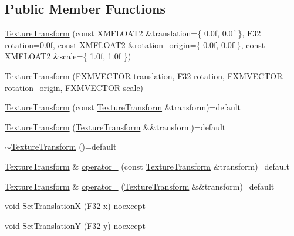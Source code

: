 \subsection*{Public Member Functions}
\begin{DoxyCompactItemize}
\item 
\hyperlink{classmage_1_1_texture_transform_a9c0f8f7f31f283b0877037489ddb2d0b}{Texture\+Transform} (const X\+M\+F\+L\+O\+A\+T2 \&translation=\{ 0.\+0f, 0.\+0f \}, F32 rotation=0.\+0f, const X\+M\+F\+L\+O\+A\+T2 \&rotation\+\_\+origin=\{ 0.\+0f, 0.\+0f \}, const X\+M\+F\+L\+O\+A\+T2 \&scale=\{ 1.\+0f, 1.\+0f \})
\item 
\hyperlink{classmage_1_1_texture_transform_ac64ee6cc9b0339dadf69e808a98387e2}{Texture\+Transform} (F\+X\+M\+V\+E\+C\+T\+OR translation, \hyperlink{namespacemage_aa97e833b45f06d60a0a9c4fc22ae02c0}{F32} rotation, F\+X\+M\+V\+E\+C\+T\+OR rotation\+\_\+origin, F\+X\+M\+V\+E\+C\+T\+OR scale)
\item 
\hyperlink{classmage_1_1_texture_transform_ae9805a51cc43bd89a4bf94ac0ac49ae2}{Texture\+Transform} (const \hyperlink{classmage_1_1_texture_transform}{Texture\+Transform} \&transform)=default
\item 
\hyperlink{classmage_1_1_texture_transform_aa0b4bd0dedfdf0351cb01d056533c984}{Texture\+Transform} (\hyperlink{classmage_1_1_texture_transform}{Texture\+Transform} \&\&transform)=default
\item 
\hyperlink{classmage_1_1_texture_transform_afb608ccc7bc107b893ea68937529a901}{$\sim$\+Texture\+Transform} ()=default
\item 
\hyperlink{classmage_1_1_texture_transform}{Texture\+Transform} \& \hyperlink{classmage_1_1_texture_transform_a0166da366dcf3054db133dda5867cf87}{operator=} (const \hyperlink{classmage_1_1_texture_transform}{Texture\+Transform} \&transform)=default
\item 
\hyperlink{classmage_1_1_texture_transform}{Texture\+Transform} \& \hyperlink{classmage_1_1_texture_transform_a82adfc646b3467f33d92f7f2e24bf28e}{operator=} (\hyperlink{classmage_1_1_texture_transform}{Texture\+Transform} \&\&transform)=default
\item 
void \hyperlink{classmage_1_1_texture_transform_a27831f1102666269024706d42e1b79b0}{Set\+TranslationX} (\hyperlink{namespacemage_aa97e833b45f06d60a0a9c4fc22ae02c0}{F32} x) noexcept
\item 
void \hyperlink{classmage_1_1_texture_transform_a3c8d11ee771bab59e7960c616ff7261e}{Set\+TranslationY} (\hyperlink{namespacemage_aa97e833b45f06d60a0a9c4fc22ae02c0}{F32} y) noexcept

\end{DoxyCompactItemize}

